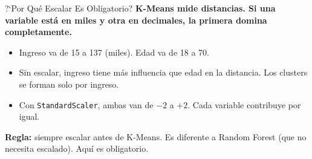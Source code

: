 \documentclass[aspectratio=169, 11pt]{beamer}
\begin{document}
\begin{frame}{?`Por Qu\'e Escalar Es Obligatorio?}
  \vspace{-4pt}
  {\footnotesize\color{arcaDark}\bfseries
    K-Means mide \textbf{distancias}. Si una variable est\'a en miles
    y otra en decimales, la primera domina completamente.}

  \vspace{6pt}
  {\footnotesize
  \begin{itemize}\setlength{\itemsep}{5pt}
    \item[{\color{arcaRed}\scriptsize\faArrowRight}]
      Ingreso va de 15 a 137 (miles). Edad va de 18 a 70.
    \item[{\color{arcaRed}\scriptsize\faArrowRight}]
      Sin escalar, ingreso tiene m\'as influencia que edad
      en la distancia. Los clusters se forman solo por ingreso.
    \item[{\color{codeGreen}\scriptsize\faArrowRight}]
      Con \texttt{StandardScaler}, ambas van de $-2$ a $+2$.
      Cada variable contribuye por igual.
  \end{itemize}
  }

  \vspace{6pt}
  \begin{tcolorbox}[colback=arcaRed!8, colframe=arcaRed, boxrule=0.5pt, arc=2pt,
    left=6pt, right=6pt, top=4pt, bottom=4pt]
    {\scriptsize\color{arcaDark}
    \faExclamationTriangle\hspace{4pt}\textbf{Regla:} siempre escalar
    antes de K-Means. Es diferente a Random Forest (que no necesita escalado).
    Aqu\'i es obligatorio.}
  \end{tcolorbox}
\end{frame}
\end{document}
